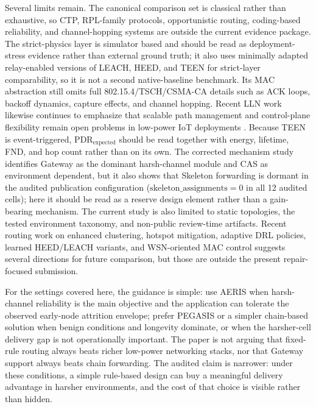\documentclass[letterpaper,conference]{IEEEtran}
\begin{document}
Several limits remain. The canonical comparison set is classical rather than exhaustive, so CTP, RPL-family protocols, opportunistic routing, coding-based reliability, and channel-hopping systems are outside the current evidence package. The strict-physics layer is simulator based and should be read as deployment-stress evidence rather than external ground truth; it also uses minimally adapted relay-enabled versions of LEACH, HEED, and TEEN for strict-layer comparability, so it is not a second native-baseline benchmark. Its MAC abstraction still omits full 802.15.4/TSCH/CSMA-CA details such as ACK loops, backoff dynamics, capture effects, and channel hopping. Recent LLN work likewise continues to emphasize that scalable path management and control-plane flexibility remain open problems in low-power IoT deployments \cite{almutairi2024survey,djennadi2025exploring,brito2026ec,habib2026edcc,cheppali2025hybrid}. Because TEEN is event-triggered, $\mathrm{PDR}_{\mathrm{expected}}$ should be read together with energy, lifetime, FND, and hop count rather than on its own. The corrected mechanism study identifies Gateway as the dominant harsh-channel module and CAS as environment dependent, but it also shows that Skeleton forwarding is dormant in the audited publication configuration ($\mathrm{skeleton\_assignments}=0$ in all 12 audited cells); here it should be read as a reserve design element rather than a gain-bearing mechanism. The current study is also limited to static topologies, the tested environment taxonomy, and non-public review-time artifacts. Recent routing work on enhanced clustering, hotspot mitigation, adaptive DRL policies, learned HEED/LEACH variants, and WSN-oriented MAC control \cite{kaddi2024energy-efficient,prince2025multi,thakur2025ai-driven,el2024efficient,juwaied2025enhanced,alhammad2026sd} suggests several directions for future comparison, but those are outside the present repair-focused submission.

For the settings covered here, the guidance is simple: use AERIS when harsh-channel reliability is the main objective and the application can tolerate the observed early-node attrition envelope; prefer PEGASIS or a simpler chain-based solution when benign conditions and longevity dominate, or when the harsher-cell delivery gap is not operationally important. The paper is not arguing that fixed-rule routing always beats richer low-power networking stacks, nor that Gateway support always beats chain forwarding. The audited claim is narrower: under these conditions, a simple rule-based design can buy a meaningful delivery advantage in harsher environments, and the cost of that choice is visible rather than hidden.
\end{document}
